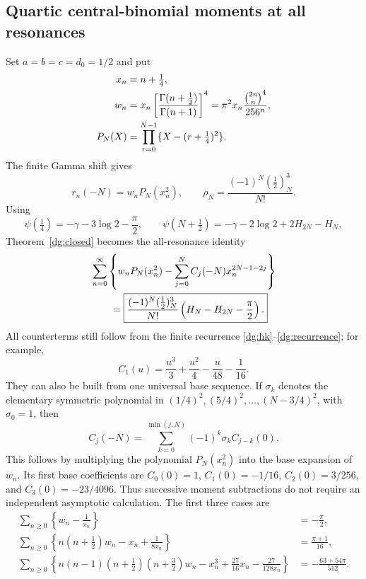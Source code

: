 \documentclass[11pt,a4paper]{article}
\numberwithin{equation}{section}
\theoremstyle{definition}
\theoremstyle{remark}
\begin{document}
\subsection{Quartic central-binomial moments at all resonances}
Set $a=b=c=d_0=1/2$ and put
\begin{align}
 x_n&=n+\tfrac14,\notag\\
 w_n&=x_n\left[\frac{\Gamma(n+\tfrac12)}{\Gamma(n+1)}\right]^4
      =\pi^2x_n\frac{\binom{2n}{n}^4}{256^n},
                   \label{dg:wn}\\
 P_N(X)&=\prod_{r=0}^{N-1}\{X-(r+\tfrac14)^2\}.
                   \label{dg:PN}
\end{align}
The finite Gamma shift gives
\begin{equation}\label{dg:quarticterm}
 r_n(-N)=w_nP_N(x_n^2),\qquad
 \rho_N=\frac{(-1)^N(\tfrac12)_N^3}{N!}.
\end{equation}
Using
\[
 \psi(\tfrac14)=-\gamma-3\log2-\frac\pi2,
 \qquad
 \psi(N+\tfrac12)=-\gamma-2\log2+2H_{2N}-H_N,
\]
Theorem~\ref{dg:closed} becomes the all-resonance identity
\begin{align}
 &\sum_{n=0}^{\infty}\left\{w_nP_N(x_n^2)
            -\sum_{j=0}^{N}C_j(-N)x_n^{2N-1-2j}\right\}\notag\\
 &\qquad=\boxed{\frac{(-1)^N(\tfrac12)_N^3}{N!}
                  \left(H_N-H_{2N}-\frac\pi2\right).}
                  \label{dg:quarticall}
\end{align}
All counterterms still follow from the finite recurrence
\eqref{dg:hk}--\eqref{dg:recurrence}; for example,
\begin{equation}\label{dg:quarticC1}
 C_1(u)=\frac{u^3}{3}+\frac{u^2}{4}-\frac{u}{48}-\frac1{16}.
\end{equation}
They can also be built from one universal base sequence. If $\sigma_k$ denotes
the elementary symmetric polynomial in
$(1/4)^2,(5/4)^2,\ldots,(N-3/4)^2$, with $\sigma_0=1$, then
\begin{equation}\label{dg:quarticcoefficienttransport}
 C_j(-N)=\sum_{k=0}^{\min(j,N)}(-1)^k\sigma_k C_{j-k}(0).
\end{equation}
This follows by multiplying the polynomial $P_N(x_n^2)$ into the
base expansion of $w_n$. Its first base coefficients are
$C_0(0)=1$, $C_1(0)=-1/16$, $C_2(0)=3/256$, and
$C_3(0)=-23/4096$. Thus successive moment subtractions do not require
an independent asymptotic calculation.
The first three cases are
\begin{align}
 \sum_{n\ge0}\left\{w_n-\frac1{x_n}\right\}
       &=-\frac\pi2,\label{dg:quarticN0}\\
 \sum_{n\ge0}\left\{n(n+\tfrac12)w_n-x_n+\frac1{8x_n}\right\}
       &=\frac{\pi+1}{16},\label{dg:quarticN1}\\
 \sum_{n\ge0}\left\{n(n-1)(n+\tfrac12)(n+\tfrac32)w_n
      -x_n^3+\frac{27}{16}x_n-\frac{27}{128x_n}\right\}
       &=-\frac{63+54\pi}{512}.\label{dg:quarticN2}
\end{align}
\end{document}
